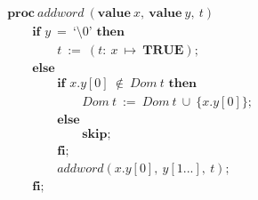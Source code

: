 \documentclass[a4paper, fleqn]{article}
\begin{document}
\begin{align*}
		&\textbf{proc}\ \textit{addword}\ (\textbf{value}\ x,\ \textbf{value}\ y,\ t) \\
		&\qquad \textbf{if } y\ =\ \text{`\textbackslash0'}\textbf{ then} \\
		&\qquad\qquad t\ :=\ (t:\ x\ \mapsto\ \textbf{TRUE}); \\
		&\qquad \textbf{else} \\
		&\qquad\qquad\textbf{if } x.y[0]\ \notin\ Dom\ t\textbf{ then} \\
		&\qquad\qquad\qquad Dom\ t\ :=\ Dom\ t\ \cup\ \{x.y[0]\}; \\
		&\qquad\qquad\textbf{else} \\
		&\qquad\qquad\qquad \textbf{skip};\\
		&\qquad\qquad\textbf{fi;} \\
		&\qquad\qquad\textit{addword}(x.y[0],\ y[1...],\ t); \\
		&\qquad \textbf{fi;}
\end{align*}
\end{document}
